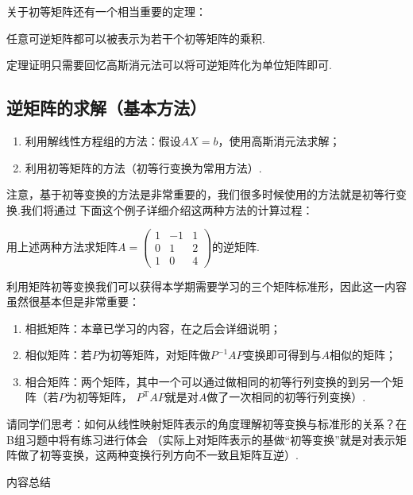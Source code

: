 关于初等矩阵还有一个相当重要的定理：

\begin{theorem}
    任意可逆矩阵都可以被表示为若干个初等矩阵的乘积.
\end{theorem}
定理证明只需要回忆高斯消元法可以将可逆矩阵化为单位矩阵即可.

\subsection{逆矩阵的求解（基本方法）}
\begin{enumerate}
    \item 利用解线性方程组的方法：假设$AX=b$，使用高斯消元法求解；

    \item 利用初等矩阵的方法（初等行变换为常用方法）.
\end{enumerate}

注意，基于初等变换的方法是非常重要的，我们很多时候使用的方法就是初等行变换.我们将通过
下面这个例子详细介绍这两种方法的计算过程：
\begin{example}
    用上述两种方法求矩阵$A=\begin{pmatrix}1 & -1 & 1 \\ 0 & 1 & 2 \\ 1 & 0 & 4\end{pmatrix}$的逆矩阵.
\end{example}
\begin{solution}

\end{solution}

利用矩阵初等变换我们可以获得本学期需要学习的三个矩阵标准形，因此这一内容虽然很基本但是非常重要：
\begin{enumerate}
    \item 相抵矩阵：本章已学习的内容，在之后会详细说明；
    \item 相似矩阵：若$P$为初等矩阵，对矩阵做$P^{-1}AP$变换即可得到与$A$相似的矩阵；
    \item 相合矩阵：两个矩阵，其中一个可以通过做相同的初等行列变换的到另一个矩阵（若$P$为初等矩阵，
    $P^{\mathrm{T}}AP$就是对$A$做了一次相同的初等行列变换）.
\end{enumerate}
请同学们思考：如何从线性映射矩阵表示的角度理解初等变换与标准形的关系？在B组习题中将有练习进行体会
（实际上对矩阵表示的基做``初等变换''就是对表示矩阵做了初等变换，这两种变换行列方向不一致且矩阵互逆）.

\vspace{2ex}
\centerline{\heiti \Large 内容总结}

